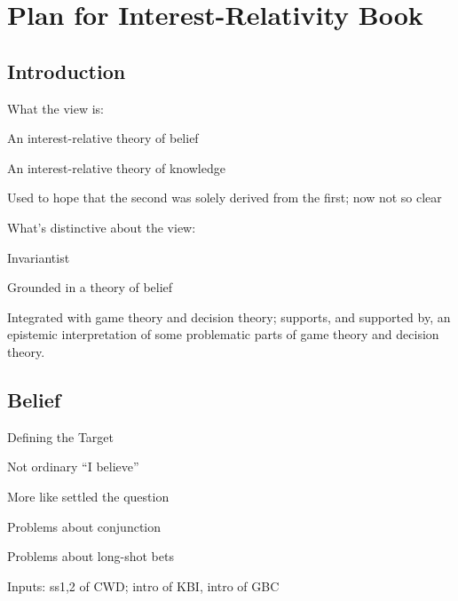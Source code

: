 \documentclass[11pt,oneside]{book}
\begin{document}
\chapter{Plan for Interest-Relativity Book}

\section*{Introduction}
What the view is:
\begin{itemize*}
\item An interest-relative theory of belief
\item An interest-relative theory of knowledge
\item Used to hope that the second was solely derived from the first; now not so clear
\end{itemize*}
What's distinctive about the view:
\begin{itemize*}
\item Invariantist
\item Grounded in a theory of belief
\item Integrated with game theory and decision theory; supports, and supported by, an epistemic interpretation of some problematic parts of game theory and decision theory.
\end{itemize*}

\noindent 

\noindent 

\section{Belief}
\label{belief}

\begin{itemize*}
\item Defining the Target

\begin{itemize*}
\item Not ordinary ``I believe''

\item More like settled the question

\end{itemize*}

\item Problems about conjunction

\item Problems about long-shot bets

\end{itemize*}
Inputs: ss1,2 of CWD; intro of KBI, intro of GBC
\end{document}
